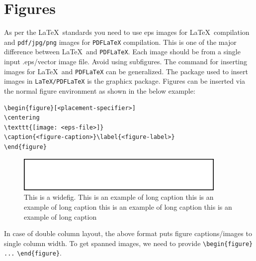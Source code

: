 \documentclass[default,pdflatex,iicol]{sn-jnl}%
\begin{document}
\section{Figures}\label{sec6}

As per the \LaTeX\ standards you need to use eps images for \LaTeX\ compilation and \verb+pdf/jpg/png+ images for \verb+PDFLaTeX+ compilation. This is one of the major difference between \LaTeX\ and \verb+PDFLaTeX+. Each image should be from a single input .eps/vector image file. Avoid using subfigures. The command for inserting images for \LaTeX\ and \verb+PDFLaTeX+ can be generalized. The package used to insert images in \verb+LaTeX/PDFLaTeX+ is the graphicx package. Figures can be inserted via the normal figure environment as shown in the below example:

\bigskip
\begin{verbatim}
\begin{figure}[<placement-specifier>]
\centering
\texttt{[image: <eps-file>]}
\caption{<figure-caption>}\label{<figure-label>}
\end{figure}
\end{verbatim}
\bigskip

\begin{figure}[h]%
\centering
\includegraphics[width=0.9\textwidth]{fig.eps}
\caption{This is a widefig. This is an example of long caption this is an example of long caption  this is an example of long caption this is an example of long caption}\label{fig1}
\end{figure}

In case of double column layout, the above format puts figure captions/images to single column width. To get spanned images, we need to provide \verb+\begin{figure}+ \verb+...+ \verb+\end{figure}+.
\end{document}
